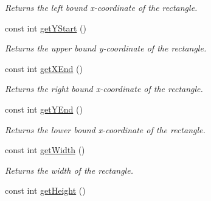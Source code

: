 \begin{DoxyCompactItemize}
\begin{DoxyCompactList}\small\item\em Returns the left bound x-\/coordinate of the rectangle. \end{DoxyCompactList}\item 
\hypertarget{class_rectangle_a3d16a808b34565ad26776b60577e1bf0}{const int \hyperlink{class_rectangle_a3d16a808b34565ad26776b60577e1bf0}{get\+Y\+Start} ()}\label{class_rectangle_a3d16a808b34565ad26776b60577e1bf0}

\begin{DoxyCompactList}\small\item\em Returns the upper bound y-\/coordinate of the rectangle. \end{DoxyCompactList}\item 
\hypertarget{class_rectangle_a748cc274ed586f2a4267cccee4c8aa03}{const int \hyperlink{class_rectangle_a748cc274ed586f2a4267cccee4c8aa03}{get\+X\+End} ()}\label{class_rectangle_a748cc274ed586f2a4267cccee4c8aa03}

\begin{DoxyCompactList}\small\item\em Returns the right bound x-\/coordinate of the rectangle. \end{DoxyCompactList}\item 
\hypertarget{class_rectangle_a05b2d3f5dbf1c0aa92cff4ce6e302f94}{const int \hyperlink{class_rectangle_a05b2d3f5dbf1c0aa92cff4ce6e302f94}{get\+Y\+End} ()}\label{class_rectangle_a05b2d3f5dbf1c0aa92cff4ce6e302f94}

\begin{DoxyCompactList}\small\item\em Returns the lower bound x-\/coordinate of the rectangle. \end{DoxyCompactList}\item 
\hypertarget{class_rectangle_afaea2e6cab12d85e7076e47f092be772}{const int \hyperlink{class_rectangle_afaea2e6cab12d85e7076e47f092be772}{get\+Width} ()}\label{class_rectangle_afaea2e6cab12d85e7076e47f092be772}

\begin{DoxyCompactList}\small\item\em Returns the width of the rectangle. \end{DoxyCompactList}\item 
\hypertarget{class_rectangle_a0fdee2c935c22e3b668e8d1c8e62c8e4}{const int \hyperlink{class_rectangle_a0fdee2c935c22e3b668e8d1c8e62c8e4}{get\+Height} ()}\label{class_rectangle_a0fdee2c935c22e3b668e8d1c8e62c8e4}


\end{DoxyCompactItemize}
